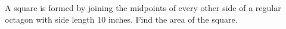 A square is formed by joining the midpoints of every other side of a regular octagon with side length $10$ inches. Find the area of the square.
